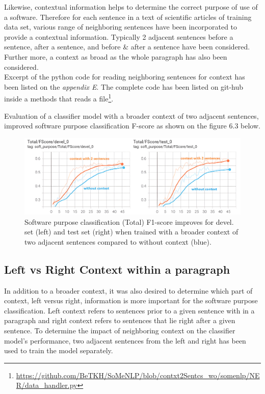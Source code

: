 Likewise, contextual information helps to determine the correct purpose of use of a software. Therefore for each sentence in a text of scientific articles of training data set, various range of neighboring sentences have been incorporated to provide a contextual information. Typically 2 adjacent sentences before a sentence, after a sentence, and before \& after a sentence have been considered. Further more, a context as broad as the whole paragraph has also been considered. \\

Excerpt of the python code for reading neighboring sentences for context has been listed on the \emph{appendix E}. The complete code has been listed on git-hub inside a methods that reads a file\footnote{\url{https://github.com/BeTKH/SoMeNLP/blob/contxt2Sentcs_wo/somenlp/NER/data_handler.py}}. 

Evaluation of a classifier model with a broader context of two adjacent sentences, improved software purpose classification F-score as shown on the figure 6.3 below. 

\begin{figure}[htbp]
	\centering
	\includegraphics[width=.90\textwidth]{4.graphics/figures/ch_6/2.left_context_vs_right/HD/braoderContextFscore}
	\caption{Software purpose classification (Total) F1-score improves for devel. set (left) and test set (right) when trained with a broader context of two adjacent sentences compared to without context (blue).}
	\label{fig:chapter06:with}
\end{figure}

\subsection{Left vs Right Context within a paragraph}
\label{sec:chapter06:leftvsright}

In addition to a broader context, it was also desired to determine which part of context, left versus right, information is more important for the software purpose classification. Left context refers to sentences prior to a given sentence with in  a paragraph and right context refers to sentences that lie right after a given sentence. To determine the impact of neighboring context on the classifier model's performance, two adjacent sentences from the left and right has been used to train the model separately.  \\

